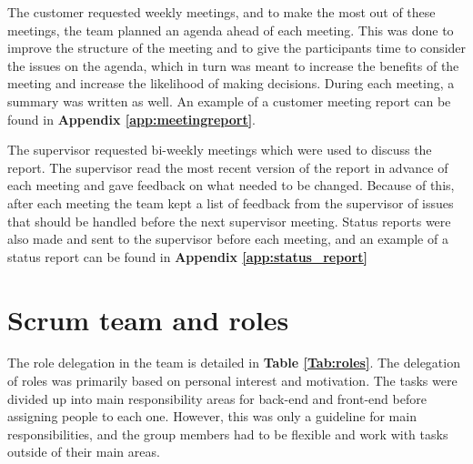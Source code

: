 The customer requested weekly meetings, and to make the most out of these meetings, the team planned an agenda ahead of each meeting. This was done to improve the structure of the meeting and to give the participants time to consider the issues on the agenda, which in turn was meant to increase the benefits of the meeting and increase the likelihood of making decisions. During each meeting, a summary was written as well. An example of a customer meeting report can be found in \textbf{Appendix \ref{app:meetingreport}}.\newline

The supervisor requested bi-weekly meetings which were used to discuss the report. The supervisor read the most recent version of the report in advance of each meeting and gave feedback on what needed to be changed. Because of this, after each meeting the team kept a list of feedback from the supervisor of issues that should be handled before the next supervisor meeting. Status reports were also made and sent to the supervisor before each meeting, and an example of a status report can be found in \textbf{Appendix \ref{app:status_report}}

\section{Scrum team and roles}
\label{sec:scrum_team_and_roles}

The role delegation in the team is detailed in \textbf{Table \ref{Tab:roles}}. The delegation of roles was primarily based on personal interest and motivation. The tasks were divided up into main responsibility areas for back-end and front-end before assigning people to each one. However, this was only a guideline for main responsibilities, and the group members had to be flexible and work with tasks outside of their main areas.

